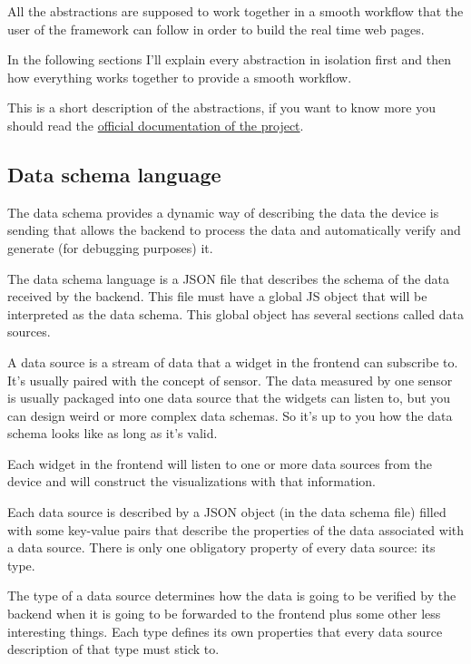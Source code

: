 \documentclass[12pt]{article}
\begin{document}
        All the abstractions are supposed to work together in a smooth workflow
        that the user of the framework can follow in order to build the real
        time web pages.

        In the following sections I'll explain every abstraction in isolation
        first and then how everything works together to provide a smooth
        workflow.

        This is a short description of the abstractions, if you want to know
        more you should read the
        \href{http://lupulo.readthedocs.org/en/latest/index.html}{official
        documentation of the project}.

        \subsection{Data schema language}
            The data schema provides a dynamic way of describing the data the
            device is sending that allows the backend to process the data and
            automatically verify and generate (for debugging purposes) it.

            The data schema language is a JSON file that describes the schema of
            the data received by the backend.  This file must have a global JS
            object that will be interpreted as the data schema. This global
            object has several sections called data sources.

            A data source is a stream of data that a widget in the frontend can
            subscribe to.  It's usually paired with the concept of sensor.
            The data measured by one sensor is usually packaged into one data
            source that the widgets can listen to, but you can design weird or
            more complex data schemas. So it's up to you how the data schema
            looks like as long as it's valid.

            Each widget in the frontend will listen to one or more data sources
            from the device and will construct the visualizations with that
            information.

            Each data source is described by a JSON object (in the data schema
            file) filled with some key-value pairs that describe the properties
            of the data associated with a data source. There is only one
            obligatory property of every data source: its type.

            The type of a data source determines how the data is going to be
            verified by the backend when it is going to be forwarded to the
            frontend plus some other less interesting things. Each type defines
            its own properties that every data source description of that type
            must stick to.
\end{document}
